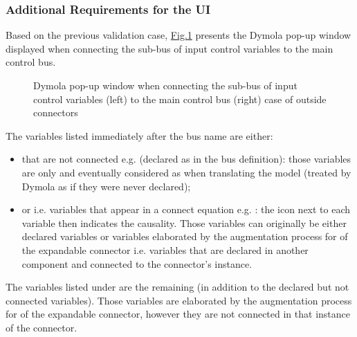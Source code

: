 \documentclass[letterpaper,10pt, openany,english]{sphinxmanual}
\begin{document}
\subsubsection{Additional Requirements for the UI}
\label{\detokenize{requirements:additional-requirements-for-the-ui}}
Based on the previous validation case, \hyperref[\detokenize{requirements:dymola-bus}]{Fig.\@ \ref{\detokenize{requirements:dymola-bus}}} presents the Dymola pop-up window displayed when connecting the sub-bus of input control variables to the main control bus.

\begin{figure}[htbp]
\centering
\capstart

\noindent{}
\caption{Dymola pop-up window when connecting the sub-bus of input control variables (left) to the main control bus (right) \textendash{} case of outside connectors}\label{\detokenize{requirements:dymola-bus}}\end{figure}

The variables listed immediately after the bus name are either:
\begin{itemize}
\item {} 
 that are not connected e.g.  (declared as  in the bus definition): those variables are only  and eventually considered as  when translating the model (treated by Dymola as if they were never declared);

\item {} 
or  i.e. variables that appear in a connect equation e.g. : the icon next to each variable then indicates the causality. Those variables can originally be either declared variables or variables elaborated by the augmentation process for  of the expandable connector i.e. variables that are declared in another component and connected to the connector’s instance.

\end{itemize}

The variables listed under  are the remaining  (in addition to the declared but not connected variables). Those variables are elaborated by the augmentation process for  of the expandable connector, however they are not connected in that instance of the connector.
\end{document}
